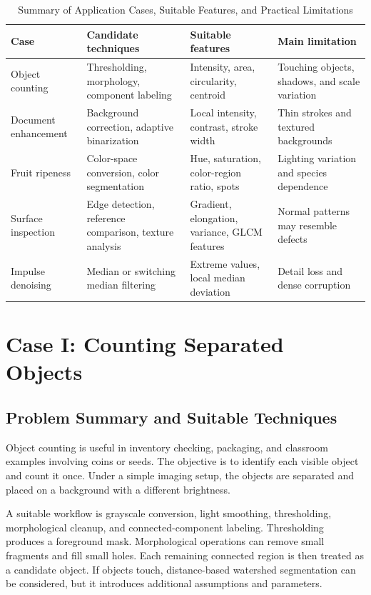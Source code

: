 \documentclass[conference]{IEEEtran}
\begin{document}
\begin{table}[t]
\caption{Summary of Application Cases, Suitable Features, and Practical Limitations}
\label{tab:summary}
\centering
\footnotesize
\renewcommand{\arraystretch}{1.16}
\begin{tabular}{p{}p{}p{}p{}}
\toprule
Case & Candidate techniques & Suitable features & Main limitation\\
\midrule
Object counting & Thresholding, morphology, component labeling & Intensity, area, circularity, centroid & Touching objects, shadows, and scale variation\\
Document enhancement & Background correction, adaptive binarization & Local intensity, contrast, stroke width & Thin strokes and textured backgrounds\\
Fruit ripeness & Color-space conversion, color segmentation & Hue, saturation, color-region ratio, spots & Lighting variation and species dependence\\
Surface inspection & Edge detection, reference comparison, texture analysis & Gradient, elongation, variance, GLCM features & Normal patterns may resemble defects\\
Impulse denoising & Median or switching median filtering & Extreme values, local median deviation & Detail loss and dense corruption\\
\bottomrule
\end{tabular}
\end{table}

\section{Case I: Counting Separated Objects}
\subsection{Problem Summary and Suitable Techniques}
Object counting is useful in inventory checking, packaging, and classroom examples involving coins or seeds. The objective is to identify each visible object and count it once. Under a simple imaging setup, the objects are separated and placed on a background with a different brightness.

A suitable workflow is grayscale conversion, light smoothing, thresholding, morphological cleanup, and connected-component labeling. Thresholding produces a foreground mask. Morphological operations can remove small fragments and fill small holes. Each remaining connected region is then treated as a candidate object. If objects touch, distance-based watershed segmentation can be considered, but it introduces additional assumptions and parameters.
\end{document}
